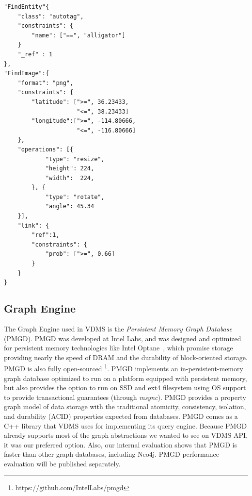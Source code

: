\begin{listing}[ht!]
\begin{verbatim}
"FindEntity"{
    "class": "autotag",
    "constraints": {
        "name": ["==", "alligator"]
    }
    "_ref" : 1
},
"FindImage":{
    "format": "png",
    "constraints": {
        "latitude": [">=", 36.23433,
                     "<=", 38.23433]
        "longitude":[">=", -114.80666,
                     "<=", -116.80666]
    },
    "operations": [{
            "type": "resize",
            "height": 224,
            "width":  224,
        }, {
            "type": "rotate",
            "angle": 45.34
    }],
    "link": {
        "ref":1,
        "constraints": {
            "prob": [">=", 0.66]
        }
    }
}

\end{verbatim}
\caption{Sample Query for Image Retrieval -
The query expresses the following:
Find all the images connected to the autotag \textit{alligator}
with probability higher than 0.66,
filter the images by latitude and longitude within 1 degree,
apply a resize operation to make the images 224x224,
rotate the image 45.34 degrees,
and return the images as "png" files.}
\label{findimagegeo}
\end{listing}

\subsection{Graph Engine}

The Graph Engine used in VDMS is the
\textit{Persistent Memory Graph Database} (PMGD).
PMGD was developed at Intel Labs, and was designed and optimized for
persistent memory technologies like Intel Optane~\cite{IntelXPoint15}, which
promise storage providing nearly the speed of DRAM and the
durability of block-oriented storage.
PMGD is also fully open-sourced \footnote{https://github.com/IntelLabs/pmgd}.
PMGD implements an in-persistent-memory graph database optimized
to run on a platform equipped with persistent memory, but
also provides the option to run on SSD and ext4 filesystem
using OS support to provide transactional guarantees (through \textit{msync}).
PMGD provides a property graph model of data storage with the traditional
atomicity, consistency, isolation, and durability
(ACID) properties expected from databases.
PMGD comes as a C++ library that VDMS uses for implementing its query engine.
Because PMGD already supports most of the graph abstractions we wanted
to see on VDMS API, it was our preferred option.
Also, our internal evaluation shows that PMGD is faster
than other graph databases, including Neo4j\cite{miller2013graph}.
PMGD performance evaluation will be published separately.

